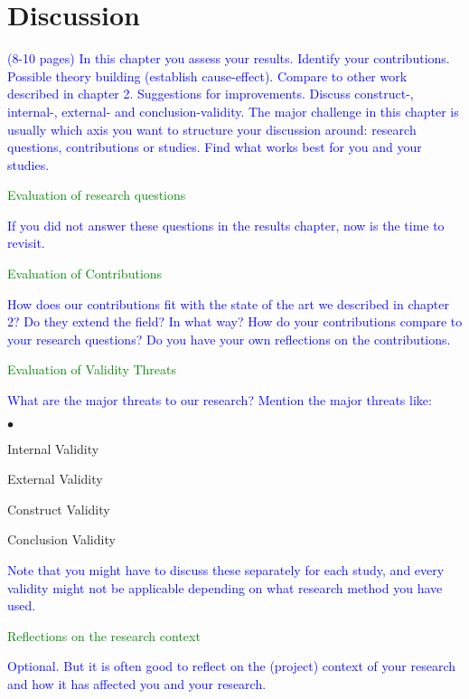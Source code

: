 \chapter{Discussion}


\textcolor{blue}{(8-10 pages) In this chapter you assess your results. Identify your contributions. Possible theory 
building (establish cause-effect). Compare to other work described in chapter 2. Suggestions for improvements. Discuss 
construct-, internal-, external- and conclusion-validity. The major challenge in this chapter is usually which axis you 
want to structure your discussion around: research questions, contributions or studies. Find what works best for you 
and your studies.}

\textcolor{green}{Evaluation of research questions}

\textcolor{blue}{If you did not answer these questions in the results chapter, now is the time to revisit.}

\textcolor{green}{Evaluation of Contributions}

\textcolor{blue}{How does our contributions fit with the state of the art we described in chapter 2? Do they extend the 
field? In what way? How do your contributions compare to your research questions? Do you have your own reflections on 
the contributions.}

\textcolor{green}{Evaluation of Validity Threats}

\textcolor{blue}{What are the major threats to our research? Mention the major threats like:}

\begin{list}{$\bullet$}{}
  \item Internal Validity 
  \item External Validity
  \item Construct Validity
  \item Conclusion Validity
\end{list}

\textcolor{blue}{Note that you might have to discuss these separately for each study, and every validity might not be applicable depending on what research method you have used.}

\textcolor{green}{Reflections on the research context}

\textcolor{blue}{Optional. But it is often good to reflect on the (project) context of your research and how it has 
affected you and your research.}